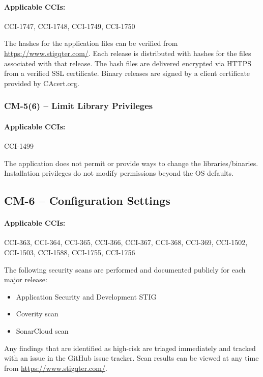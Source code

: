 \documentclass[letterpaper, 10pt, twoside]{article}
\begin{document}
\paragraph{Applicable CCIs:} CCI-1747, CCI-1748, CCI-1749, CCI-1750

The hashes for the application files can be verified from \url{https://www.stigqter.com/}. Each release is distributed with hashes for the files associated with that release. The hash files are delivered encrypted via HTTPS from a verified SSL certificate. Binary releases are signed by a client certificate provided by CAcert.org.

\subsubsection{CM-5(6) -- Limit Library Privileges}

\paragraph{Applicable CCIs:} CCI-1499

The application does not permit or provide ways to change the libraries/binaries. Installation privileges do not modify permissions beyond the OS defaults.

\subsection{CM-6 -- Configuration Settings}

\paragraph{Applicable CCIs:} CCI-363, CCI-364, CCI-365, CCI-366, CCI-367, CCI-368, CCI-369, CCI-1502, CCI-1503, CCI-1588, CCI-1755, CCI-1756

The following security scans are performed and documented publicly for each major release:
\begin{itemize}
	\item Application Security and Development STIG
	\item Coverity scan
	\item SonarCloud scan
\end{itemize}

Any findings that are identified as high-risk are triaged immediately and tracked with an issue in the GitHub issue tracker. Scan results can be viewed at any time from \url{https://www.stigqter.com/}.
\end{document}

